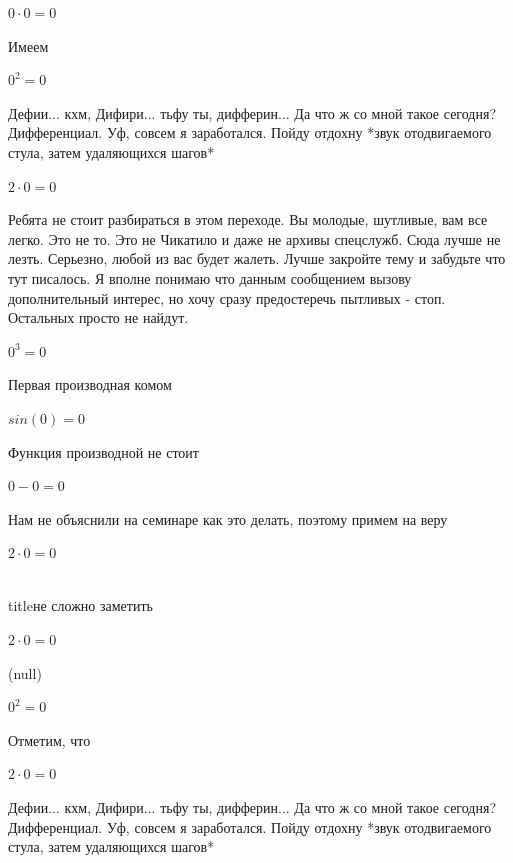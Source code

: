 \documentclass[12pt,a4paper,fleqn]{article}
\begin{document}
\begin{center}$0 \cdot 0 = 0$\end{center}
Имеем

\begin{center}$0^{2} = 0$\end{center}
Дефии... кхм, Дифири... тьфу ты, дифферин... Да что ж со мной такое сегодня? Дифференциал. Уф, совсем я заработался. Пойду отдохну *звук отодвигаемого стула, затем удаляющихся шагов*

\begin{center}$2 \cdot 0 = 0$\end{center}
Ребята не стоит разбираться в этом переходе. Вы молодые, шутливые, вам все легко. Это не то. Это не Чикатило и даже не архивы спецслужб. Сюда лучше не лезть. Серьезно, любой из вас будет жалеть. Лучше закройте тему и забудьте что тут писалось. Я вполне понимаю что данным сообщением вызову дополнительный интерес, но хочу сразу предостеречь пытливых - стоп. Остальных просто не найдут.

\begin{center}$0^{3} = 0$\end{center}
Первая производная комом\cite{link2}

\begin{center}$sin(0) = 0$\end{center}
Функция производной не стоит\cite{link2}

\begin{center}$0-0 = 0$\end{center}
Нам не объяснили на семинаре как это делать, поэтому примем на веру

\begin{center}$2 \cdot 0 = 0$\end{center}
\\ title{не сложно заметить} 

\begin{center}$2 \cdot 0 = 0$\end{center}
(null)\cite{link4}

\begin{center}$0^{2} = 0$\end{center}
Отметим, что

\begin{center}$2 \cdot 0 = 0$\end{center}
Дефии... кхм, Дифири... тьфу ты, дифферин... Да что ж со мной такое сегодня? Дифференциал. Уф, совсем я заработался. Пойду отдохну *звук отодвигаемого стула, затем удаляющихся шагов*
\end{document}
